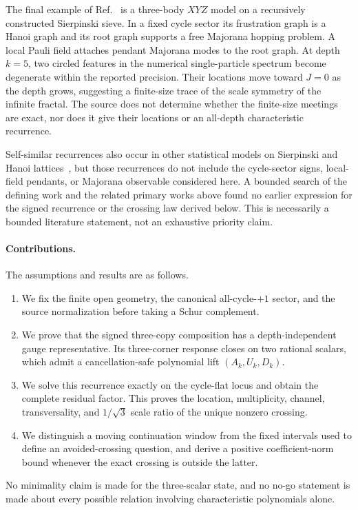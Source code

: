 \documentclass[11pt]{article}
\theoremstyle{remark}
\begin{document}
The final example of Ref.~\cite{ChapmanFlammia2020} is a three-body $XYZ$
model on a recursively constructed Sierpinski sieve.  In a fixed cycle sector
its frustration graph is a Hanoi graph and its root graph supports a free
Majorana hopping problem.  A local Pauli field attaches pendant Majorana modes
to the root graph.  At depth $k=5$, two circled features in the numerical
single-particle spectrum become degenerate within the reported precision.
Their locations move toward $J=0$ as the depth grows, suggesting a finite-size
trace of the scale symmetry of the infinite fractal.  The source does not
determine whether the finite-size meetings are exact, nor does it give their
locations or an all-depth characteristic recurrence.

Self-similar recurrences also occur in other statistical models on Sierpinski
and Hanoi lattices~\cite{Alvarez2023}, but those recurrences do not include the
cycle-sector signs, local-field pendants, or Majorana observable considered
here.  A bounded search of the defining work and the related primary works
above found no earlier expression for the signed recurrence or the crossing
law derived below.  This is necessarily a bounded literature statement, not
an exhaustive priority claim.

\paragraph{Contributions.}
The assumptions and results are as follows.
\begin{enumerate}
  \item We fix the finite open geometry, the canonical all-cycle-$+1$ sector,
  and the source normalization before taking a Schur complement.
  \item We prove that the signed three-copy composition has a depth-independent
  gauge representative.  Its three-corner response closes on two rational
  scalars, which admit a cancellation-safe polynomial lift $(A_k,U_k,D_k)$.
  \item We solve this recurrence exactly on the cycle-flat locus and obtain the
  complete residual factor.  This proves the location, multiplicity, channel,
  transversality, and $1/\sqrt3$ scale ratio of the unique nonzero crossing.
  \item We distinguish a moving continuation window from the fixed intervals
  used to define an avoided-crossing question, and derive a positive
  coefficient-norm bound whenever the exact crossing is outside the latter.
\end{enumerate}
No minimality claim is made for the three-scalar state, and no no-go statement
is made about every possible relation involving characteristic polynomials
alone.
\end{document}
